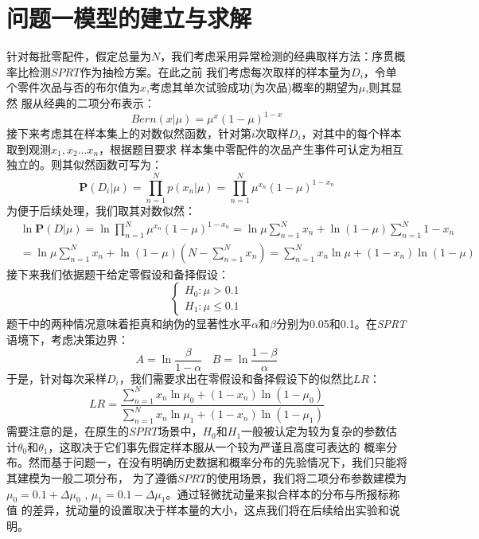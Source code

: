 \documentclass[withoutpreface,bwprint]{cumcmthesis} %
\begin{document}
\section{问题一模型的建立与求解}
针对每批零配件，假定总量为$N$，我们考虑采用异常检测的经典取样方法：序贯概率比检测$SPRT$作为抽检方案。在此之前
我们考虑每次取样的样本量为$D_i$，令单个零件次品与否的布尔值为$x$,考虑其单次试验成功(为次品)概率的期望为$\mu$,则其显然
服从经典的二项分布表示：
\begin{equation}
	\textit{Bern}(x|\mu) = \mu^x (1 - \mu)^{1-x}
\end{equation}
接下来考虑其在样本集上的对数似然函数，针对第$i$次取样$D_i$，对其中的每个样本取到观测$x_1,x_2...x_n$，根据题目要求
样本集中零配件的次品产生事件可认定为相互独立的。则其似然函数可写为：
\begin{equation}
	\mathbf{P}(D_i|\mu) = \prod_{n=1}^{N} p(x_n|\mu) = \prod_{n=1}^{N} \mu^{x_n} (1 - \mu)^{1-x_n}
\end{equation}
为便于后续处理，我们取其对数似然：
\begin{equation}
	\begin{split}
		&\ln\mathbf{P}(D|\mu) = \ln \prod_{n=1}^{N} \mu^{x_n} (1 - \mu)^{1-x_n}
		= \ln \mu \sum_{n=1}^{N} x_n + \ln(1 - \mu) \sum_{n=1}^{N} 1 - x_n \\
		&=  \ln \mu \sum_{n=1}^{N} x_n + \ln(1 - \mu) (N - \sum_{n=1}^{N} x_n)
		= \sum_{n=1}^{N} x_n \ln \mu + (1 - x_n) \ln(1 - \mu)
	\end{split}
\end{equation}
接下来我们依据题干给定零假设和备择假设：
\begin{equation}
	\begin{cases}
		H_0: \mu > 0.1 \\
		H_1: \mu \le 0.1
	\end{cases}
\end{equation}
题干中的两种情况意味着拒真和纳伪的显著性水平$\alpha$和$\beta$分别为0.05和0.1。在\textit{SPRT}语境下，考虑决策边界：
$$ A = \ln \frac{\beta}{1 - \alpha} \ \ \ \  B = \ln \frac{1 - \beta}{\alpha}$$
于是，针对每次采样$D_i$，我们需要求出在零假设和备择假设下的似然比$LR$：
\begin{equation}
	LR= \frac{\sum_{n=1}^{N} x_n \ln \mu_0 + (1 - x_n) \ln(1 - \mu_0)}{\sum_{n=1}^{N} x_n \ln \mu_1 + (1 - x_n) \ln(1 - \mu_1)}
\end{equation}
需要注意的是，在原生的$SPRT$场景中，$H_0$和$H_1$一般被认定为较为复杂的参数估计$\theta_0$和$\theta_1$，这取决于它们事先假定样本服从一个较为严谨且高度可表达的
概率分布。然而基于问题一，在没有明确历史数据和概率分布的先验情况下，我们只能将其建模为一般二项分布，
为了遵循$SPRT$的使用场景，我们将二项分布参数建模为$\mu_0=0.1+\Delta \mu_0$ , $\mu_1=0.1-\Delta \mu_1$。通过轻微扰动量来拟合样本的分布与所报标称值
的差异，扰动量的设置取决于样本量的大小，这点我们将在后续给出实验和说明。
\end{document}
